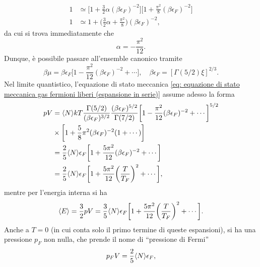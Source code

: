 \begin{caso}
\begin{equation}
\begin{split}
           1 &\simeq \bigg[1 + \frac{3}{2}\alpha(\beta\epsilon_F)^{-2}\bigg] \bigg[1 + \frac{\pi^2}{8}(\beta\epsilon_F)^{-2}\bigg] \\
           1 &\simeq 1 + \bigg(\frac{3}{2}\alpha + \frac{\pi^2}{8}\bigg)(\beta\epsilon_F)^{-2},
        \end{split}
    \end{equation}
    da cui si trova immediatamente che 
    \begin{equation}
        \alpha = -\frac{\pi^2}{12}.
    \end{equation}
    Dunque, è possibile passare all'ensemble canonico tramite
    \begin{equation}
        \beta\mu = \beta\epsilon_F\bigg[1 - \frac{\pi^2}{12}(\beta\epsilon_F)^{-2} + \cdots\bigg],\quad \beta\epsilon_F = [\Gamma(5/2)\xi]^{2/3}.
    \end{equation}
    Nel limite quantistico, l'equazione di stato meccanica \eqref{eq: equazione di stato meccanica gas fermioni liberi (espansione in serie)} assume adesso la forma
    \begin{equation}
        \begin{split}
            pV &= \langle N \rangle k T \frac{\Gamma(5/2)}{(\beta \epsilon_F)^{3/2}} \frac{(\beta \epsilon_F)^{5/2}}{\Gamma(7/2)} \bigg[ 1 - \frac{\pi^2}{12}(\beta \epsilon_F)^{-2} + \cdots \bigg]^{5/2} \\
            &\times\bigg[ 1 + \frac{5}{8}\pi^2 (\beta \epsilon_F)^{-2}(1+\cdots) \bigg] \\
            &= \frac{2}{5} \langle N \rangle \epsilon_F
            \bigg[ 1 + \frac{5\pi^2}{12}(\beta \epsilon_F)^{-2} + \cdots \bigg] \\ 
            &= \frac{2}{5} \langle N \rangle \epsilon_F \bigg[ 1 + \frac{5\pi^2}{12}\bigg(\frac{T}{T_F}\bigg)^2 + \cdots \bigg],
            \end{split} 
    \end{equation}
    mentre per l'energia interna si ha
    \begin{equation}
        \langle E \rangle = \frac{3}{2} pV = \frac{3}{5} \langle N \rangle \epsilon_F
        \bigg[ 1 + \frac{5\pi^2}{12}\bigg(\frac{T}{T_F}\bigg)^2 + \cdots \bigg].
    \end{equation}
    Anche a $T = 0$ (in cui conta solo il primo termine di queste espansioni), si ha una pressione $p_F$ non nulla, che prende il nome di ``pressione di Fermi''
    \begin{equation}
        p_FV = \frac{2}{5} \langle N \rangle \epsilon_F,
    \end{equation}

\end{caso}
